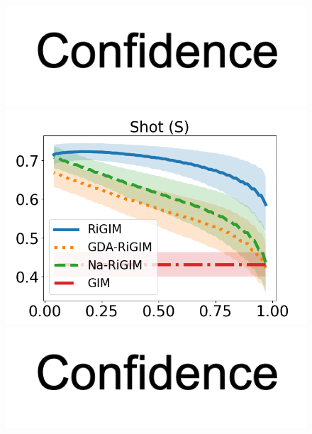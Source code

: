 \documentclass{article}
\begin{document}
\begin{figure}[htbp]
\begin{minipage}{0.16\textwidth}
    \vspace{-0.05in}
    \includegraphics[scale=0.12]{figures/confidence_x_label.png}
    \end{minipage}
    \begin{minipage}{0.16\textwidth}
    \centering
    \includegraphics[scale=0.14]{figures/risk_curve_S_shadow.png}\par
    \vspace{-0.05in}
    \includegraphics[scale=0.12]{figures/confidence_x_label.png}
    \end{minipage}
    \begin{minipage}{0.16\textwidth}
    \centering

\end{minipage}
\end{figure}
\end{document}
